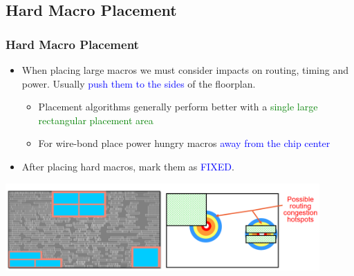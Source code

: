 \documentclass[compress]{beamer}
\begin{document}
\subsection[Macro]{Hard Macro Placement}
	\begin{frame}
		\frametitle{Hard Macro Placement}
		\begin{itemize}
			\item When placing large macros we must consider impacts on routing,
			timing and power. Usually \textcolor{blue}{push them to the sides} of the floorplan.
				\begin{itemize}
					\item Placement algorithms generally perform better with a
					\textcolor{green}{single large rectangular placement area}
					\item For wire-bond place power hungry macros \textcolor{blue}{away from the chip center}
				\end{itemize}
			\item After placing hard macros, mark them as \textcolor{blue}{FIXED}.
		\end{itemize}
		\begin{center}
			\includegraphics[width=0.9\textwidth]{Hard Macro}
		\end{center}
	\end{frame}
\end{document}
